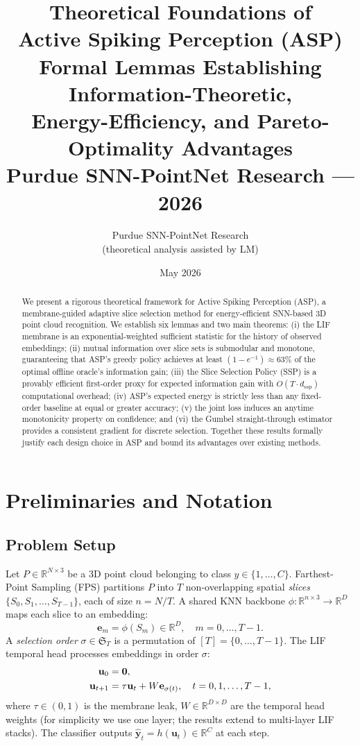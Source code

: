 \documentclass[11pt,a4paper]{article}
\title{%
  \textbf{Theoretical Foundations of}\\
  \textbf{Active Spiking Perception (ASP)}\\[8pt]
  \large Formal Lemmas Establishing Information-Theoretic,\\
  Energy-Efficiency, and Pareto-Optimality Advantages\\[8pt]
  \normalsize Purdue SNN-PointNet Research --- 2026
}
\author{Purdue SNN-PointNet Research \\ (theoretical analysis assisted by LM)}
\date{May 2026}
\newcommand{\bu}{\mathbf{u}}
\newcommand{\be}{\mathbf{e}}
\newcommand{\by}{\mathbf{y}}
\newcommand{\bW}{W}
\newcommand{\RR}{\mathbb{R}}
\begin{document}
\maketitle

\begin{abstract}
We present a rigorous theoretical framework for Active Spiking Perception (ASP), a
membrane-guided adaptive slice selection method for energy-efficient SNN-based 3D
point cloud recognition. We establish six lemmas and two main theorems: (i) the LIF
membrane is an exponential-weighted sufficient statistic for the history of observed
embeddings; (ii) mutual information over slice sets is submodular and monotone,
guaranteeing that ASP's greedy policy achieves at least $(1-e^{-1}) \approx 63\%$
of the optimal offline oracle's information gain; (iii) the Slice Selection Policy
(SSP) is a provably efficient first-order proxy for expected information gain with
$O(T \cdot d_\mathrm{ssp})$ computational overhead; (iv) ASP's expected energy
is strictly less than any fixed-order baseline at equal or greater accuracy;
(v) the joint loss induces an anytime monotonicity property on confidence; and
(vi) the Gumbel straight-through estimator provides a consistent gradient for
discrete selection. Together these results formally justify each design choice
in ASP and bound its advantages over existing methods.
\end{abstract}

\tableofcontents
\newpage

\section{Preliminaries and Notation}

\subsection{Problem Setup}

Let $P \in \RR^{N \times 3}$ be a 3D point cloud belonging to class $y \in \{1,\ldots,C\}$.
Farthest-Point Sampling (FPS) partitions $P$ into $T$ non-overlapping spatial
\emph{slices} $\{S_0, S_1, \ldots, S_{T-1}\}$, each of size $n = N/T$.  A shared
KNN backbone $\phi: \RR^{n \times 3} \to \RR^D$ maps each slice to an embedding:
\[
  \be_m = \phi(S_m) \in \RR^D, \quad m = 0,\ldots, T-1.
\]
A \emph{selection order} $\sigma \in \mathfrak{S}_T$ is a permutation of $[T] =
\{0,\ldots,T-1\}$.  The LIF temporal head processes embeddings in order $\sigma$:
\begin{align}
  \bu_0 &= \mathbf{0}, \notag\\
  \bu_{t+1} &= \tau \bu_t + \bW \be_{\sigma(t)},
    \quad t = 0,1,\ldots, T-1,
    \label{eq:lif}
\end{align}
where $\tau \in (0,1)$ is the membrane leak, $\bW \in \RR^{D \times D}$ are the
temporal head weights (for simplicity we use one layer; the results extend to
multi-layer LIF stacks).  The classifier outputs
$\hat{\by}_t = h(\bu_t) \in \RR^C$ at each step.
\end{document}
